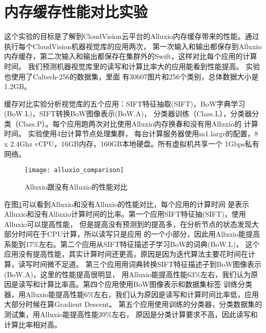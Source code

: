 \section{内存缓存性能对比实验}
\label{sec:memory-cache-experiment}
这个实验的目标是了解到CloudVision云平台的Alluxio内存缓存带来的性能。通过执行每个CloudVision机器视觉库的应用两次，
第一次输入和输出都保存到Alluxio内存缓存，第二次输入和输出都保存在集群外的Swift，这样对比每个应用的计算时间。
我们预测机器视觉库里的读写和计算比率大的应用能看到性能提高。
实验也使用了Caltech-256的数据集，里面
有30607图片和256个类别，总体数据大小是1.2GB。

缓存对比实验分析视觉库的五个应用：SIFT特征抽取(SIFT)，BoW字典学习(BoW.L)，SIFT转换BoW图像表示(BoW.A)，
分类器训练（Class.L），分类器分类（Class.P）。每个应用跑两次对比使用Alluxio内存换春和没有用Alluxio的
计算时间。
实验使用4台计算节点处理集群，
每台计算服务器使用m1.large的配置，8 x 2.4Ghz vCPU，16GB内存，160GB本地硬盘。所有虚拟机共享一个
1Gbps私有网络。

\begin{figure}[h]
  \centering
    \texttt{[image: alluxio\_comparison]}
  \caption{Alluxio跟没有Alluxio的性能对比}
  \label{fig:alluxio-comparison}
\end{figure}

在图\ref{fig:alluxio-comparison}可以看到Alluxio和没有Alluxio的性能对比，每个应用的计算时间
是表示Alluxio和没有Alluxio计算时间的比率。第一个应用SIFT特征抽(SIFT)，使用Alluxio可以提高性能，
但是提高没有预测到的提高多，在分析节点的状态发现大部分时间在于CPU计算，所以读写只是应用
的一个小部分，因此用Alluxio能提高系能到17\%左右。第二个应用从SIFT特征描述子学习BoW的词典(BoW.L)，
这个应用没有提高性能，其实计算时间还更高，原因是因为迭代算法主要花时间在计算，读写时间微不足道。
第三个应用用词典转换SIFT特征描述子到BoW图像表示(BoW.A)，这里的性能提高很明显，
用Alluxio能提高性能63\%左右，我们认为原因是读写和计算比率高。第四个应用使用BoW图像表示和数据集标签
训练分类器，用Alluxio能提高性能6\%左右，我们认为原因是读写和计算时间比率低，应用大部分时候在算Gradient Descent。
第五个应用使用训练的分类器，分类数据集的测试集，用Alluxio能提高性能39\%左右，
原因是分类计算要求不高，因此读写和计算比率相对高。
